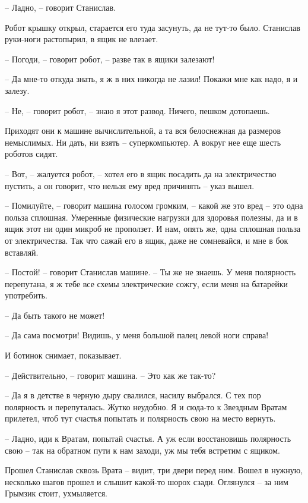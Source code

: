 \documentclass[ebook,oneside,final,openright]{memoir}
\begin{document}
– Ладно, – говорит Станислав.\par
Робот крышку открыл, старается его туда засунуть, да не тут-то было. Станислав руки-ноги растопырил, в ящик не влезает. \par
– Погоди, – говорит робот, – разве так в ящики залезают! \par
– Да мне-то откуда знать, я ж в них никогда не лазил! Покажи мне как надо, я и залезу. \par
– Не, – говорит робот, – знаю я этот развод. Ничего, пешком дотопаешь.\par
\par
Приходят они к машине вычислительной, а та вся белоснежная да размеров немыслимых. Ни дать, ни взять – суперкомпьютер. А вокруг нее еще шесть роботов сидят. \par
– Вот, – жалуется робот, – хотел его в ящик посадить да на электричество пустить, а он говорит, что нельзя ему вред причинять – указ вышел. \par
– Помилуйте, – говорит машина голосом громким, – какой же это вред – это одна польза сплошная. Умеренные физические нагрузки для здоровья полезны, да и в ящик этот ни один микроб не проползет. И нам, опять же, одна сплошная польза от электричества. Так что сажай его в ящик, даже не сомневайся, и мне в бок вставляй. \par
– Постой! – говорит Станислав машине. – Ты же не знаешь. У меня полярность перепутана, я ж тебе все схемы электрические сожгу, если меня на батарейки употребить. \par
– Да быть такого не может! \par
– Да сама посмотри! Видишь, у меня большой палец левой ноги справа! \par
И ботинок снимает, показывает. \par
– Действительно, – говорит машина. – Это как же так-то? \par
– Да я в детстве в черную дыру свалился, насилу выбрался. С тех пор полярность и перепуталась. Жутко неудобно. Я и сюда-то к Звездным Вратам прилетел, чтоб тут счастья попытать и полярность свою на место вернуть. \par
– Ладно, иди к Вратам, попытай счастья. А уж если восстановишь полярность свою – так на обратном пути к нам заходи, уж мы тебя встретим с ящиком.\par
\par
Прошел Станислав сквозь Врата – видит, три двери перед ним. Вошел в нужную, несколько шагов прошел и слышит какой-то шорох сзади. Оглянулся – за ним Грымзик стоит, ухмыляется. \par
\end{document}
